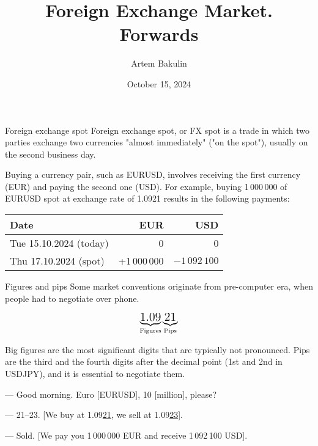 \documentclass{beamer}
\title{Foreign Exchange Market. Forwards}
\author{Artem Bakulin}
\date{October 15, 2024}
\begin{document}
\begin{frame}
\titlepage
\end{frame}



\begin{frame}{Foreign exchange spot}
\justify
\alert{Foreign exchange spot, or FX spot} is a trade in which two parties exchange two currencies "almost immediately" ("on the spot"), usually on the second business day.

\justify
Buying a currency pair, such as EURUSD, involves receiving the first currency (EUR) and paying the second one (USD). For example, buying 1\,000\,000 of EURUSD spot at exchange rate of 1.0921 results in the following payments:
\justify

\centering
\begin{tabular}{l|r|r}
Date                          & EUR & USD \\ \hline
Tue 15.10.2024 (today)  & 0   & 0   \\
Thu 17.10.2024 (spot)     & +1\,000\,000 & $-1\,092\,100$
\end{tabular}
\end{frame}



\begin{frame}{Figures and pips}
\justify
Some market conventions originate from pre-computer era, when people had to negotiate
over phone.

\begin{align*}
\underbrace{\text{\Large 1.09}}_{\text{Figures}}\underbrace{\text{\Large 21}}_{\text{Pips}}
\end{align*}
\justify

\alert{Big figures} are  the most significant digits that are typically not pronounced. \alert{Pips} are the third and the fourth digits after the decimal point (1st and 2nd in USDJPY), and it is essential to negotiate them.

\justify
--- Good morning. Euro [EURUSD], 10 [million], please?

--- 21--23. [We buy at 1.09\underline{21}, we sell at 1.09\underline{23}].

--- Sold. [We pay you 1\,000\,000 EUR and receive 1\,092\,100 USD].
\end{frame}
\end{document}
